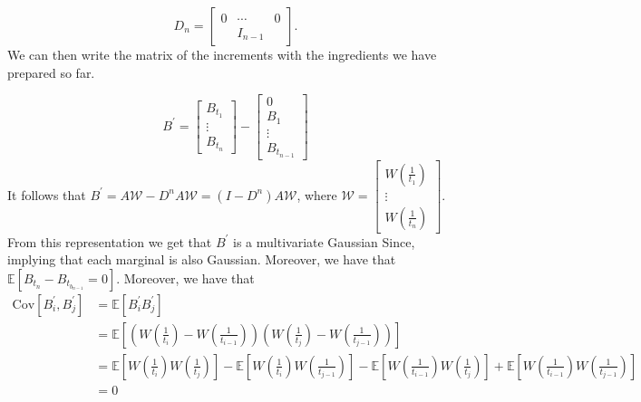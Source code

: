 \documentclass[a4paper,12pt]{article} %
\newcommand{\Cov}{\mathrm{Cov}}
\begin{document}
\begin{equation}
    D_n =
    \begin{bmatrix}
        0 & \cdots  & 0 \\
          & I_{n-1} &
    \end{bmatrix}.
\end{equation}
We can then write the matrix of the increments with the ingredients we have prepared so far.

\begin{equation}B^{\prime} =
    \begin{bmatrix}
        B_{t_1} \\
        \vdots  \\
        B_{t_n}
    \end{bmatrix}
    -
    \begin{bmatrix}
        0      \\
        B_1    \\
        \vdots \\
        B_{t_{n-1}}
    \end{bmatrix}
\end{equation}
It follows that \(B^{\prime} = A \mathcal{W}- D^{n}A \mathcal{W}  =(I-D^n)A \mathcal{W} \), where \(\mathcal{W} = \begin{bmatrix}
    W\left( \frac{1}{t_1} \right) \\
    \vdots                        \\
    W\left( \frac{1}{t_n} \right)
\end{bmatrix}\).
From this representation we get that \(B^{\prime} \) is a multivariate Gaussian Since, implying that each marginal is also Gaussian.
Moreover, we have that \(\mathbb{E} \left[ B_{t_n}- B_{t_{b_{n-1}}} = 0  \right]\). Moreover, we have that
\begin{align*}
    \Cov\left[B^{\prime}_i, B^{\prime} _j \right]
     & = \mathbb{E} \left[ B_{i}^{\prime}B^{\prime} _j   \right]                                                                                                                                                                                                                                                                                                                       \\
     & = \mathbb{E} \left[ \left( W\left( \frac{1}{t_i} \right) - W\left( \frac{1}{t_{i-1}} \right) \right) \left( W\left( \frac{1}{t_j} \right) - W\left( \frac{1}{t_{j-1}} \right) \right) \right]                                                                                                                                                                                   \\
     & = \mathbb{E} \left[ W\left( \frac{1}{t_i} \right) W\left( \frac{1}{t_j} \right) \right] - \mathbb{E} \left[ W\left( \frac{1}{t_i} \right) W\left( \frac{1}{t_{j-1}} \right) \right] - \mathbb{E} \left[ W\left( \frac{1}{t_{i-1}} \right) W\left( \frac{1}{t_j} \right) \right] + \mathbb{E} \left[ W\left( \frac{1}{t_{i-1}} \right) W\left( \frac{1}{t_{j-1}} \right) \right] \\
     & = 0
\end{align*}
\end{document}
